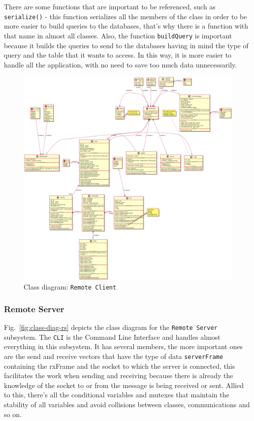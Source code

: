 There are some functions that are important to be referenced, such as \texttt{serialize()} - this function serializes all the members of the class in order to be more easier to build queries to the databases, that's why there is a function with that name in almost all classes.
Also, the function \texttt{buildQuery} is important because it builds the queries to send to the databases having in mind the type of query and the table that it wants to access. In this way, it is more easier to handle all the application, with no need to save too much data unnecessarily.  
%
\begin{figure}[htb!]
\centering
    \includegraphics[width=1.0\columnwidth]{./img/class-diag-rc-hugo.png}
  \caption{Class diagram: \texttt{Remote Client}}%
\label{fig:class-diag-rc}
\end{figure}

\subsubsection{Remote Server}
\label{sec:remote-server-class}
%
Fig.~\ref{fig:class-diag-rs} depicts the class diagram for the \texttt{Remote Server} subsystem.
The \texttt{CLI} is the Command Line Interface and handles almost everything in this subsystem. It has several members, the more important ones are the send and receive vectors that have the type of data \texttt{serverFrame} containing the rxFrame and the socket to which the server is connected, this facilitates the work when sending and receiving because there is already the knowledge of the socket to or from the message is being received or sent. Allied to this, there's all the conditional variables and mutexes that maintain the stability of all variables and avoid collisions between classes, communications and so on.

